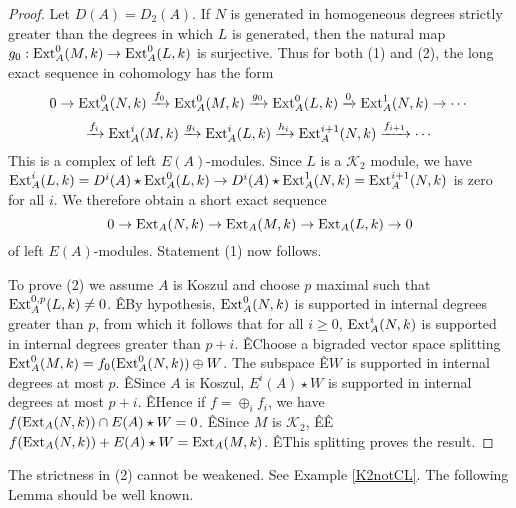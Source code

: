 \documentclass[11pt,righttag]{amsart}
\begin{document}
\begin{proof}
Let $D(A)=D_2(A)$.
 If $N$ is generated in homogeneous degrees strictly greater than the degrees in which $L$ is generated, then the natural map ${g_0:{\hbox{{\rm Ext}}}_A^0(M,k)\rightarrow{\hbox{{\rm Ext}}}_A^0(L,k)}$ is surjective. Thus for both (1) and (2),  the long exact sequence in cohomology has the form
$$0\rightarrow {\hbox{{\rm Ext}}}_A^0(N,k)\xrightarrow{f_0} {\hbox{{\rm Ext}}}_A^0(M,k)\xrightarrow{g_0} {\hbox{{\rm Ext}}}_A^0(L,k)\xrightarrow{0} {\hbox{{\rm Ext}}}_A^1(N,k)\rightarrow \cdots$$
$$\xrightarrow{f_i}{\hbox{{\rm Ext}}}_A^i(M,k)\xrightarrow{g_i} {\hbox{{\rm Ext}}}_A^i(L,k)\xrightarrow{h_i} {\hbox{{\rm Ext}}}_A^{i+1}(N,k)\xrightarrow{f_{i+1}}\cdots$$
This is a complex of left $E(A)$-modules. Since $L$ is a ${{\mathcal K}}_2$ module, we have ${\hbox{{\rm Ext}}}_A^i(L,k)=D^i(A)\star{\hbox{{\rm Ext}}}_A^0(L,k)\rightarrow D^i(A)\star{\hbox{{\rm Ext}}}_A^1(N,k)= {\hbox{{\rm Ext}}}_A^{i+1}(N,k)$ is zero for all $i$. We therefore obtain a short exact sequence
$$0\rightarrow {\hbox{{\rm Ext}}}_A(N,k)\rightarrow {\hbox{{\rm Ext}}}_A(M,k)\rightarrow {\hbox{{\rm Ext}}}_A(L,k)\rightarrow 0$$
of left $E(A)$-modules. Statement (1) now follows.

To prove (2) we assume $A$ is Koszul and choose $p$ maximal such that ${\hbox{{\rm Ext}}}^{0,p}_A(L,k) \ne 0$. ÊBy hypothesis, ${\hbox{{\rm Ext}}}^0_A(N,k)$ is supported in internal degrees greater than $p$, from which it follows that for all $i\ge 0$, ${\hbox{{\rm Ext}}}^i_A(N,k)$ is supported in internal degrees greater than $p+i$. ÊChoose a bigraded vector space splitting ${\hbox{{\rm Ext}}}^0_A(M,k )= f_0({\hbox{{\rm Ext}}}^0_A(N,k)) \oplus W$. The subspace Ê$ W$ is supported in internal degrees at most $p$. ÊSince $A$ is Koszul, $E^i(A)\star W$ is supported in internal degrees at most $p+i$. ÊHence if $f=\oplus_i f_i$, we have $f({\hbox{{\rm Ext}}}_A(N,k)) \cap E(A)\star W = 0$. ÊSince $M$ is ${{\mathcal K}}_2$, ÊÊ$f({\hbox{{\rm Ext}}}_A(N,k)) + E(A)\star W= {\hbox{{\rm Ext}}}_A(M,k)$. ÊThis splitting proves the result. 

\end{proof}

The strictness in (2) cannot be weakened. See Example \ref{K2notCL}. The following Lemma should be well known.
\end{document}
